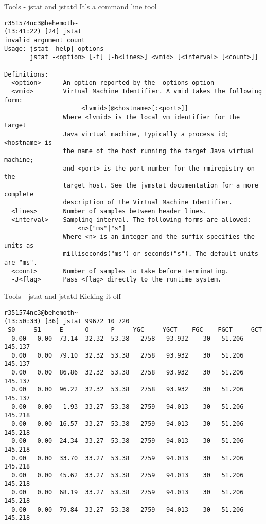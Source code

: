\documentclass[xcolor=dvipsnames,14pt]{beamer}
\begin{document}
\begin{frame}[fragile]{Tools - jstat and jstatd}
  It's a command line tool
  \begin{verbatim}
r351574nc3@behemoth~
(13:41:22) [24] jstat
invalid argument count
Usage: jstat -help|-options
       jstat -<option> [-t] [-h<lines>] <vmid> [<interval> [<count>]]

Definitions:
  <option>      An option reported by the -options option
  <vmid>        Virtual Machine Identifier. A vmid takes the following form:
                     <lvmid>[@<hostname>[:<port>]]
                Where <lvmid> is the local vm identifier for the target
                Java virtual machine, typically a process id; <hostname> is
                the name of the host running the target Java virtual machine;
                and <port> is the port number for the rmiregistry on the
                target host. See the jvmstat documentation for a more complete
                description of the Virtual Machine Identifier.
  <lines>       Number of samples between header lines.
  <interval>    Sampling interval. The following forms are allowed:
                    <n>["ms"|"s"]
                Where <n> is an integer and the suffix specifies the units as 
                milliseconds("ms") or seconds("s"). The default units are "ms".
  <count>       Number of samples to take before terminating.
  -J<flag>      Pass <flag> directly to the runtime system.
    \end{verbatim}
\end{frame}

\begin{frame}[fragile]{Tools - jstat and jstatd}
  Kicking it off
  \begin{verbatim}
r351574nc3@behemoth~
(13:50:33) [36] jstat 99672 10 720
 S0     S1     E      O      P     YGC     YGCT    FGC    FGCT     GCT   
  0.00   0.00  73.14  32.32  53.38   2758   93.932    30   51.206  145.137
  0.00   0.00  79.10  32.32  53.38   2758   93.932    30   51.206  145.137
  0.00   0.00  86.86  32.32  53.38   2758   93.932    30   51.206  145.137
  0.00   0.00  96.22  32.32  53.38   2758   93.932    30   51.206  145.137
  0.00   0.00   1.93  33.27  53.38   2759   94.013    30   51.206  145.218
  0.00   0.00  16.57  33.27  53.38   2759   94.013    30   51.206  145.218
  0.00   0.00  24.34  33.27  53.38   2759   94.013    30   51.206  145.218
  0.00   0.00  33.70  33.27  53.38   2759   94.013    30   51.206  145.218
  0.00   0.00  45.62  33.27  53.38   2759   94.013    30   51.206  145.218
  0.00   0.00  68.19  33.27  53.38   2759   94.013    30   51.206  145.218
  0.00   0.00  79.84  33.27  53.38   2759   94.013    30   51.206  145.218  
  \end{verbatim}
\end{frame}
\end{document}
